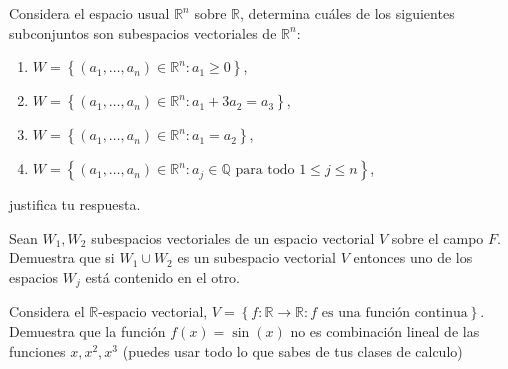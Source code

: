 \documentclass[12pt,a4paper]{article}
\begin{document}
    \begin{mdframed}[style=mdbluebox,frametitle={Ejercicio 3}]
        Considera el espacio usual $\mathbb{R}^{n}$ sobre $\mathbb{R}$, determina cuáles de los siguientes
        subconjuntos son subespacios vectoriales de $\mathbb{R}^{n}$:
        \begin{enumerate}
            \item[(a)] $W=\left\{(a_{1},\dots,a_{n})\in\mathbb{R}^{n}:a_{1}\geq0\right\}$,
            \item[(b)] $W=\left\{(a_{1},\dots,a_{n})\in\mathbb{R}^{n}:a_{1}+3a_{2}=a_{3}\right\}$,
            \item[(c)] $W=\left\{(a_{1},\dots,a_{n})\in\mathbb{R}^{n}:a_{1}=a_{2}\right\}$,
            \item[(d)] $W=\left\{(a_{1},\dots,a_{n})\in\mathbb{R}^{n}:a_{j}\in\mathbb{Q}\text{ para todo }1\leq j\leq n\right\}$,  
        \end{enumerate}
        justifica tu respuesta.
    \end{mdframed}

    \begin{mdframed}[style=mdbluebox,frametitle={Ejercicio 4}]
        Sean $W_{1},W_{2}$ subespacios vectoriales de un espacio vectorial $V$ sobre el campo
        $F$. Demuestra que si $W_{1}\cup W_{2}$ es un subespacio vectorial $V$ entonces uno de los espacios
        $W_{j}$ está contenido en el otro.
    \end{mdframed}

    \begin{mdframed}[style=mdbluebox,frametitle={Ejercicio 5}]
        Considera el $\mathbb{R}$-espacio vectorial, $V=\left\{f:\mathbb{R}\to\mathbb{R}:f\text{ es una función continua}\right\}$.
        Demuestra que la función $f(x)=\sin(x)$ no es combinación lineal de las funciones $x,x^{2},x^{3}$ (puedes usar todo lo que
        sabes de tus clases de calculo)
    \end{mdframed}
\end{document}
